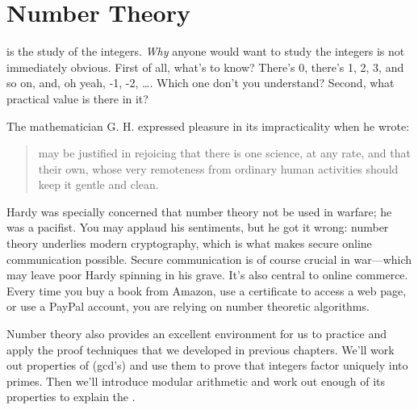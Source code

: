 \chapter{Number Theory}\label{number_theory_chap}
 is the study of the integers.  \emph{Why} anyone
would want to study the integers is not immediately obvious.  First of
all, what's to know?  There's 0, there's 1, 2, 3, and so on, and, oh yeah,
-1, -2, \dots.   Which one don't you understand?  Second, what practical
value is there in it?

\iffalse
Number theory is right at the core of mathematics; even Ug the Caveman
surely had some grasp of the integers---at least the positive ones.
In fact, the integers are so elementary that one might ask, ``What's
to study?''  There's 0, there's 1, 2, 3 and so on, and there's the
negatives.  Which one don't you understand?  Doesn't math become easy
when we don't have to worry about nasty numbers like $\sqrt{7}$, $1 /
\pi$, and $i$?  We can even forget about fractions!
\fi

The mathematician G. H.  expressed pleasure in its
impracticality when he wrote:
%
 \begin{quotation}
  may be justified in rejoicing that there
 is one science, at any rate, and that their own, whose very remoteness
 from ordinary human activities should keep it gentle and clean.
 \end{quotation}
%

 Hardy was specially concerned that number theory not be used in
 warfare; he was a pacifist.  You may applaud his sentiments, but he
 got it wrong: number theory underlies modern cryptography, which is
 what makes secure online communication possible.  Secure
 communication is of course crucial in war---which may leave poor
 Hardy spinning in his grave.  It's also central to online commerce.
 Every time you buy a book from Amazon, use a certificate to access a
 web page, or use a PayPal account, you are relying on number
 theoretic algorithms.

Number theory also provides an excellent environment for us to
practice and apply the proof techniques that we developed in previous
chapters.  We'll work out properties of 
(gcd's) and use them to prove that integers factor uniquely into
primes.  Then we'll introduce modular arithmetic and work out enough
of its properties to explain the .


